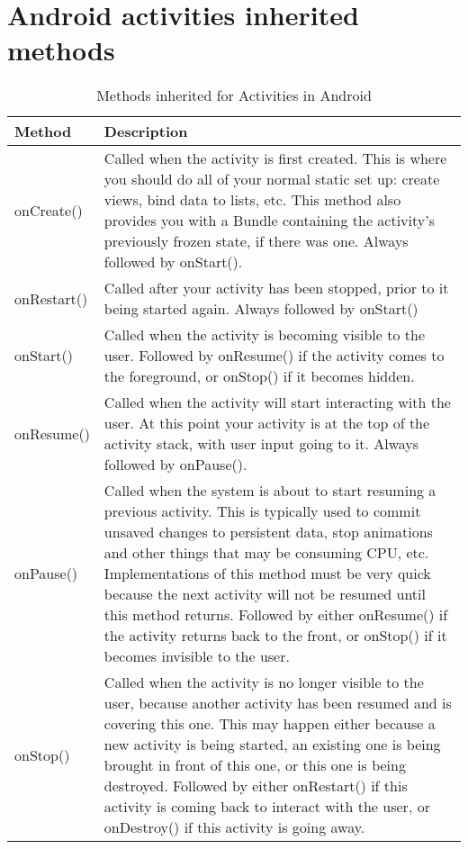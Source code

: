 \newpage
\section{Android activities inherited methods}
\label{appendix:activity methods}

\begin{table}[H]
\centering
\caption{Methods inherited for Activities in Android}
\label{my-label}
\begin{tabular}{|l|p{12cm}|}
\hline
\textbf{Method} & \textbf{Description}  \\ \hline
onCreate()      &   Called when the activity is first created. This is where you should do all of your normal static set up: create views, bind data to lists, etc. This method also provides you with a Bundle containing the activity's previously frozen state, if there was one. Always followed by onStart(). \newline \\ \hline

onRestart()     &   Called after your activity has been stopped, prior to it being started again. Always followed by onStart() \newline \\ \hline

onStart()       &   Called when the activity is becoming visible to the user. Followed by onResume() if the activity comes to the foreground, or onStop() if it becomes hidden. \newline \\ \hline

onResume()      &   Called when the activity will start interacting with the user. At this point your activity is at the top of the activity stack, with user input going to it. Always followed by onPause(). \newline \\ \hline

onPause()       &   Called when the system is about to start resuming a previous activity. This is typically used to commit unsaved changes to persistent data, stop animations and other things that may be consuming CPU, etc. Implementations of this method must be very quick because the next activity will not be resumed until this method returns. Followed by either onResume() if the activity returns back to the front, or onStop() if it becomes invisible to the user. \newline \\ \hline

onStop()        &   Called when the activity is no longer visible to the user, because another activity has been resumed and is covering this one. This may happen either because a new activity is being started, an existing one is being brought in front of this one, or this one is being destroyed. Followed by either onRestart() if this activity is coming back to interact with the user, or onDestroy() if this activity is going away. \newline \\ \hline


\end{tabular}
\end{table}
